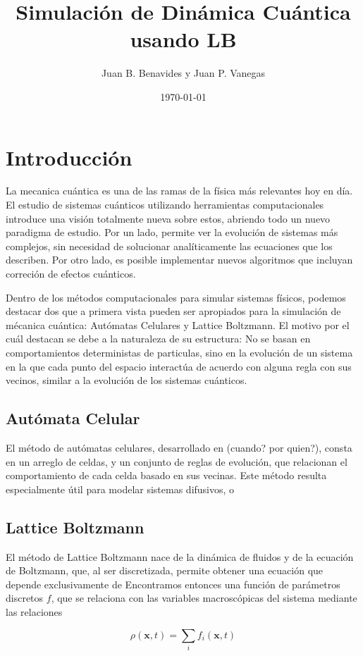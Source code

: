 \documentclass[12pts, letterpaper, twocolumn]{article}
\title{Simulación de Dinámica Cuántica usando LB}
\author{Juan B. Benavides y Juan P. Vanegas}
\date{\today}
\begin{document}
\maketitle
\section{Introducción}\label{sec:intro}
La mecanica cuántica es una de las ramas de la física más relevantes hoy en día. 
El estudio de sistemas cuánticos utilizando herramientas computacionales introduce una 
visión totalmente nueva sobre estos, abriendo todo un nuevo paradigma de estudio. Por un 
lado, permite ver la evolución de sistemas más complejos, sin necesidad de solucionar 
analíticamente las ecuaciones que los describen. Por otro lado, es posible implementar 
nuevos algoritmos que incluyan correción de efectos cuánticos.

Dentro de los métodos computacionales para simular sistemas físicos, podemos destacar dos 
que a primera vista pueden ser apropiados para la simulación de mécanica cuántica: 
Autómatas Celulares y Lattice Boltzmann. El motivo por el cuál destacan se debe a la 
naturaleza de su estructura: No se basan en comportamientos deterministas de particulas, 
sino en la evolución de un sistema en la que cada punto del espacio interactúa de acuerdo 
con alguna regla con sus vecinos, similar a la evolución de los sistemas cuánticos.

\subsection{Autómata Celular}
El método de autómatas celulares, desarrollado en (cuando? por quien?), consta en un 
arreglo de celdas, y un conjunto de reglas de evolución, que relacionan el comportamiento
de cada celda basado en sus vecinas. Este método resulta especialmente útil para modelar 
sistemas difusivos, o %

\subsection{Lattice Boltzmann}
El método de Lattice Boltzmann nace de la dinámica de fluidos y de la ecuación de 
Boltzmann, que, al ser discretizada, permite obtener una ecuación que depende 
exclusivamente de 
Encontramos entonces una función de parámetros discretos $f$, que se relaciona con las 
variables macroscópicas del sistema mediante las relaciones 

\begin{equation*}
    \rho(\textbf{x}, t) = \sum_i f_i(\textbf{x}, t)
\end{equation*}
\end{document}
